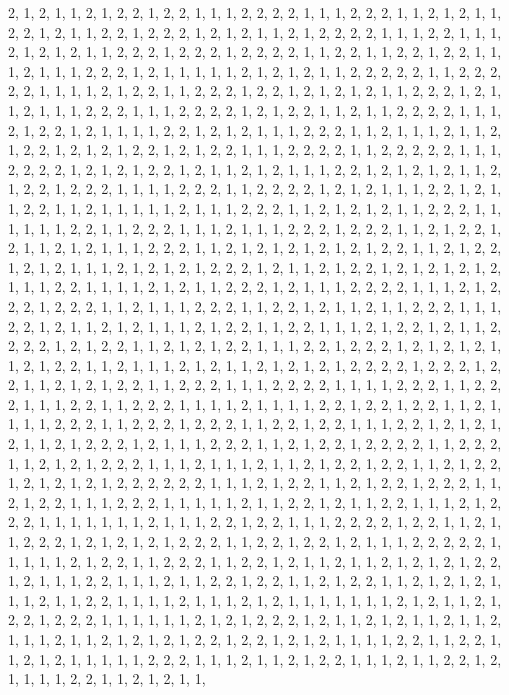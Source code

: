\documentclass[
]{article}
\begin{document}
\begin{Schunk}
\begin{Soutput}
2, 1, 2, 1, 1, 2, 1, 2, 2, 1, 2, 2, 1, 1, 1, 2, 2, 2, 2, 1, 1, 1, 2, 2, 2, 1, 1, 2, 1, 2, 1, 1, 2, 2, 1, 2, 1, 1, 2, 2, 1, 2, 2, 2, 1, 2, 1, 2, 1, 1, 2, 1, 2, 2, 2, 2, 1, 1, 1, 2, 2, 1, 1, 1, 2, 1, 2, 1, 2, 1, 1, 2, 2, 2, 1, 2, 2, 2, 1, 2, 2, 2, 2, 1, 1, 2, 2, 1, 1, 2, 2, 1, 2, 2, 1, 1, 1, 2, 1, 1, 1, 2, 2, 2, 1, 2, 1, 1, 1, 1, 1, 2, 1, 2, 1, 2, 1, 1, 2, 2, 2, 2, 2, 1, 1, 2, 2, 2, 2, 2, 1, 1, 1, 1, 2, 1, 2, 2, 1, 1, 2, 2, 2, 1, 2, 2, 1, 2, 1, 2, 1, 2, 1, 1, 2, 2, 2, 1, 2, 1, 1, 2, 1, 1, 1, 2, 2, 2, 1, 1, 1, 2, 2, 2, 2, 1, 2, 1, 2, 2, 1, 1, 2, 1, 1, 2, 2, 2, 2, 1, 1, 1, 2, 1, 2, 2, 1, 2, 1, 1, 1, 1, 2, 2, 1, 2, 1, 2, 1, 1, 1, 2, 2, 2, 1, 1, 2, 1, 1, 1, 2, 1, 1, 2, 1, 2, 2, 1, 2, 1, 2, 1, 2, 2, 1, 2, 1, 2, 2, 1, 1, 1, 2, 2, 2, 2, 1, 1, 2, 2, 2, 2, 2, 1, 1, 1, 2, 2, 2, 2, 1, 2, 1, 2, 1, 2, 2, 1, 2, 1, 1, 2, 1, 2, 1, 1, 1, 2, 2, 1, 2, 1, 2, 1, 2, 1, 1, 2, 1, 2, 2, 1, 2, 2, 2, 1, 1, 1, 1, 2, 2, 2, 1, 1, 2, 2, 2, 2, 1, 2, 1, 2, 1, 1, 1, 2, 2, 1, 2, 1, 1, 2, 2, 1, 1, 2, 1, 1, 1, 1, 1, 2, 1, 1, 1, 2, 2, 2, 1, 1, 2, 1, 2, 1, 2, 1, 1, 2, 2, 2, 1, 1, 1, 1, 1, 1, 2, 2, 1, 1, 2, 2, 2, 1, 1, 1, 2, 1, 1, 1, 2, 2, 2, 1, 2, 2, 2, 1, 1, 2, 1, 2, 2, 1, 2, 1, 1, 2, 1, 2, 1, 1, 1, 2, 2, 2, 1, 1, 2, 1, 2, 1, 2, 1, 2, 1, 2, 1, 2, 2, 1, 1, 2, 1, 2, 2, 1, 2, 1, 2, 1, 1, 1, 2, 1, 2, 1, 2, 1, 2, 2, 2, 1, 2, 1, 1, 2, 1, 2, 2, 1, 2, 1, 2, 1, 2, 1, 2, 1, 1, 1, 2, 2, 1, 1, 1, 1, 2, 1, 2, 1, 1, 2, 2, 2, 1, 2, 1, 1, 1, 2, 2, 2, 2, 1, 1, 1, 2, 1, 2, 2, 2, 1, 2, 2, 2, 1, 1, 2, 1, 1, 1, 2, 2, 2, 1, 1, 2, 2, 1, 2, 1, 1, 2, 1, 1, 2, 2, 2, 1, 1, 1, 2, 2, 1, 2, 1, 1, 2, 1, 2, 1, 1, 1, 2, 1, 2, 2, 1, 1, 2, 2, 1, 1, 1, 2, 1, 2, 2, 1, 2, 1, 1, 2, 2, 2, 2, 1, 2, 1, 2, 2, 1, 1, 2, 1, 2, 1, 2, 2, 1, 1, 1, 2, 2, 1, 2, 2, 2, 1, 2, 1, 2, 1, 2, 1, 1, 2, 1, 2, 2, 1, 1, 2, 1, 1, 1, 2, 1, 2, 1, 1, 2, 1, 2, 1, 2, 1, 2, 2, 2, 2, 1, 2, 2, 2, 1, 2, 2, 1, 1, 2, 1, 2, 1, 2, 2, 1, 1, 2, 2, 2, 1, 1, 1, 2, 2, 2, 2, 1, 1, 1, 1, 2, 2, 2, 1, 1, 2, 2, 2, 1, 1, 1, 2, 2, 1, 1, 2, 2, 2, 1, 1, 1, 1, 2, 1, 1, 1, 1, 2, 2, 1, 2, 2, 1, 2, 2, 1, 1, 2, 1, 1, 1, 1, 2, 2, 2, 1, 1, 2, 2, 2, 1, 2, 2, 2, 1, 1, 2, 2, 1, 2, 2, 1, 1, 1, 2, 2, 1, 2, 1, 2, 1, 2, 1, 1, 2, 1, 2, 2, 2, 1, 2, 1, 1, 1, 2, 2, 2, 1, 1, 2, 1, 2, 2, 1, 2, 2, 2, 2, 1, 1, 2, 2, 2, 1, 1, 2, 1, 2, 1, 2, 2, 2, 1, 1, 1, 2, 1, 1, 1, 2, 1, 1, 2, 1, 2, 2, 1, 2, 2, 1, 1, 2, 1, 2, 2, 1, 2, 1, 2, 1, 2, 1, 2, 2, 2, 2, 2, 2, 1, 1, 1, 2, 1, 2, 2, 1, 1, 2, 1, 2, 2, 1, 2, 2, 2, 1, 1, 2, 1, 2, 2, 1, 1, 1, 2, 2, 2, 1, 1, 1, 1, 1, 2, 1, 1, 2, 2, 1, 2, 1, 1, 2, 2, 1, 1, 1, 2, 1, 2, 2, 2, 1, 1, 1, 1, 1, 1, 1, 2, 1, 1, 1, 2, 2, 1, 2, 2, 1, 1, 1, 2, 2, 2, 2, 1, 2, 2, 1, 1, 2, 1, 1, 2, 2, 2, 1, 2, 1, 2, 1, 2, 1, 2, 2, 2, 1, 1, 2, 2, 1, 2, 2, 1, 2, 1, 1, 1, 2, 2, 2, 2, 2, 1, 1, 1, 1, 1, 2, 1, 2, 2, 1, 1, 2, 2, 2, 1, 1, 2, 2, 1, 2, 1, 1, 2, 1, 1, 2, 1, 2, 1, 2, 1, 2, 2, 1, 2, 1, 1, 1, 2, 2, 1, 1, 1, 2, 1, 1, 2, 2, 1, 2, 2, 1, 1, 2, 1, 2, 2, 1, 1, 2, 1, 2, 1, 2, 1, 1, 1, 2, 1, 1, 2, 2, 1, 1, 1, 1, 2, 1, 1, 1, 2, 1, 2, 1, 1, 1, 1, 1, 1, 1, 2, 1, 2, 1, 1, 2, 1, 2, 2, 1, 2, 2, 2, 1, 1, 1, 1, 1, 1, 2, 1, 2, 1, 2, 2, 2, 1, 2, 1, 1, 2, 1, 2, 1, 1, 2, 1, 1, 2, 1, 1, 1, 2, 1, 1, 2, 1, 2, 1, 2, 1, 2, 2, 1, 2, 2, 1, 2, 1, 2, 1, 1, 1, 1, 2, 2, 1, 1, 2, 2, 1, 1, 2, 1, 2, 1, 1, 1, 1, 1, 2, 2, 2, 1, 1, 1, 2, 1, 1, 2, 1, 2, 2, 1, 1, 1, 2, 1, 1, 2, 2, 1, 2, 1, 1, 1, 1, 2, 2, 1, 1, 2, 1, 2, 1, 1, 
\end{Soutput}
\end{Schunk}
\end{document}
